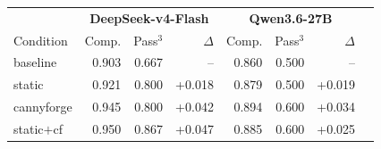 \begin{tabular}{lrrrrrrr}
\toprule
& \multicolumn{3}{c}{\textbf{DeepSeek-v4-Flash}} & \multicolumn{3}{c}{\textbf{Qwen3.6-27B}} \\
Condition & Comp. & Pass$^3$ & $\Delta$ & Comp. & Pass$^3$ & $\Delta$ \\
\midrule
baseline  & 0.903 & 0.667 & -- & 0.860 & 0.500 & -- \\
static    & 0.921 & 0.800 & +0.018 & 0.879 & 0.500 & +0.019 \\
cannyforge & 0.945 & 0.800 & +0.042 & 0.894 & 0.600 & +0.034 \\
static$+$cf & 0.950 & 0.867 & +0.047 & 0.885 & 0.600 & +0.025 \\
\bottomrule
\end{tabular}
